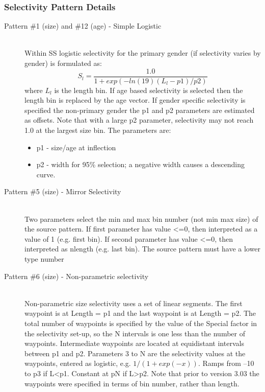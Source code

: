 \subsubsection{Selectivity Pattern Details}
\begin{description}
	\item[Pattern \#1 (size) and \#12 (age) - Simple Logistic]\hfill\\
	Within SS logistic selectivity for the primary gender (if selectivity varies by gender) is formulated as:
	\begin{equation}
	S_l = \frac{1.0}{1+exp(-ln(19)(L_l - p1)/p2)}
	\end{equation}
	where $L_l$ is the length bin.  If age based selectivity is selected then the length bin is replaced by the age vector. If gender specific selectivity is specified the non-primary gender the p1 and p2 parameters are estimated as offsets.  Note that with a large p2 parameter, selectivity may not reach 1.0 at the largest size bin. The parameters are:
		\begin{itemize}
			\item p1 - size/age at inflection
			\item p2 - width for 95\% selection; a negative width causes a descending curve.
		\end{itemize}
\end{description}


\begin{description}
	\item[Pattern \#5 (size) - Mirror Selectivity]\hfil\\
	Two parameters select the min and max bin number (not min max size) of the source pattern.  If first parameter has value <=0, then interpreted as a value of 1 (e.g. first bin).  If second parameter has value <=0, then interpreted as nlength (e.g. last bin). The source pattern must have a lower type number
\end{description}	


\begin{description}
	\item[Pattern \#6 (size) - Non-parametric selectivity]\hfil\\
	Non-parametric size selectivity uses a set of linear segments.  The first waypoint is at Length = p1 and the last waypoint is at Length = p2.  The total number of waypoints is specified by the value of the Special factor in the selectivity set-up, so the N intervals is one less than the number of waypoints.  Intermediate waypoints are located at equidistant intervals between p1 and p2.  Parameters 3 to N are the selectivity values at the waypoints, entered as logistic, e.g. $1/(1+exp(-x))$.  Ramps from –10 to p3 if L<p1.  Constant at pN if L>p2.  Note that prior to version 3.03 the waypoints were specified in terms of bin number, rather than length.
\end{description}

